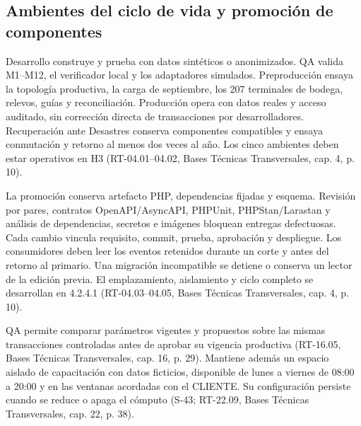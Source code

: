 \subsection{Ambientes del ciclo de vida y promoción de componentes}

Desarrollo construye y prueba con datos sintéticos o anonimizados. QA valida M1--M12, el verificador local y los adaptadores simulados. Preproducción ensaya la topología productiva, la carga de septiembre, los 207 terminales de bodega, relevos, guías y reconciliación. Producción opera con datos reales y acceso auditado, sin corrección directa de transacciones por desarrolladores. Recuperación ante Desastres conserva componentes compatibles y ensaya conmutación y retorno al menos dos veces al año. Los cinco ambientes deben estar operativos en H3 (RT-04.01--04.02, Bases Técnicas Transversales, cap. 4, p. 10).

La promoción conserva artefacto PHP, dependencias fijadas y esquema. Revisión por pares, contratos OpenAPI/AsyncAPI, PHPUnit, PHPStan/Larastan y análisis de dependencias, secretos e imágenes bloquean entregas defectuosas. Cada cambio vincula requisito, commit, prueba, aprobación y despliegue. Los consumidores deben leer los eventos retenidos durante un corte y antes del retorno al primario. Una migración incompatible se detiene o conserva un lector de la edición previa. El emplazamiento, aislamiento y ciclo completo se desarrollan en 4.2.4.1 (RT-04.03--04.05, Bases Técnicas Transversales, cap. 4, p. 10).

QA permite comparar parámetros vigentes y propuestos sobre las mismas transacciones controladas antes de aprobar su vigencia productiva (RT-16.05, Bases Técnicas Transversales, cap. 16, p. 29). Mantiene además un espacio aislado de capacitación con datos ficticios, disponible de lunes a viernes de 08:00 a 20:00 y en las ventanas acordadas con el CLIENTE. Su configuración persiste cuando se reduce o apaga el cómputo (S-43; RT-22.09, Bases Técnicas Transversales, cap. 22, p. 38).
